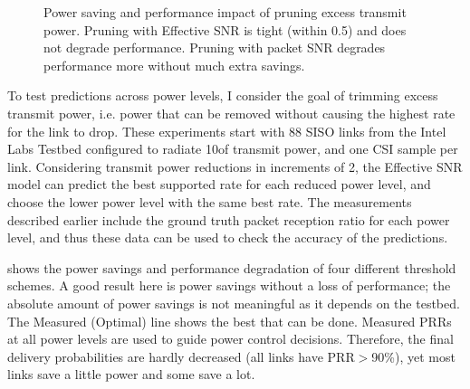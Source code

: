 \begin{figure}[t]
      \centering
      \caption{\label{fig:power_save_1x1} Power saving and performance impact of pruning excess transmit power. Pruning with Effective SNR is tight (within 0.5\dB) and does not degrade performance. Pruning with packet SNR degrades performance more without much extra savings.} 
\end{figure}

To test predictions across power levels, I consider the goal of trimming excess transmit power, i.e. power that can be removed without causing the highest rate for the link to drop. These experiments start with 88 SISO links from the Intel Labs Testbed configured to radiate 10\mW of transmit power, and one CSI sample per link. Considering transmit power reductions in increments of 2\dB, the Effective SNR model can predict the best supported rate for each reduced power level, and choose the lower power level with the same best rate. The measurements described earlier include the ground truth packet reception ratio for each power level, and thus these data can be used to check the accuracy of the predictions.

 shows the power savings and performance degradation of four different threshold schemes.
A good result here is power savings without a loss of performance; the absolute amount of power savings is not meaningful as it depends on the testbed.
The Measured (Optimal) line shows the best that can be done. Measured PRRs at all power levels are used to guide power control decisions. Therefore, the final delivery probabilities are hardly decreased (all links have PRR$>$90\%), yet most links save a little power and some save a lot. %

